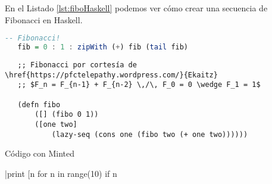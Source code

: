 \documentclass[a4paper,11pt]{article}
\begin{document}

  \listoflistings

  En el Listado \ref{lst:fiboHaskell} podemos ver cómo crear una secuencia de Fibonacci en Haskell.
  
  \begin{lstlisting}[language=haskell, caption=Código con Listings, captionpos=b, label=lst:fiboHaskell]
   -- Fibonacci!
   fib = 0 : 1 : zipWith (+) fib (tail fib)
  \end{lstlisting}
  
  \begin{listing}
   \begin{verbatim}
   ;; Fibonacci por cortesía de \href{https://pfctelepathy.wordpress.com/}{Ekaitz}
   ;; $F_n = F_{n-1} + F_{n-2} \,/\, F_0 = 0 \wedge F_1 = 1$
   
   (defn fibo
       ([] (fibo 0 1))
       ([one two]
           (lazy-seq (cons one (fibo two (+ one two))))))
   \end{verbatim}
   \label{lst:fibo}
   \caption{Código con Minted}
  \end{listing}  
  
  \py|print [n for n in range(10) if n%
  
  \inputminted{python}{fibonacci.py}
  
\end{document}
